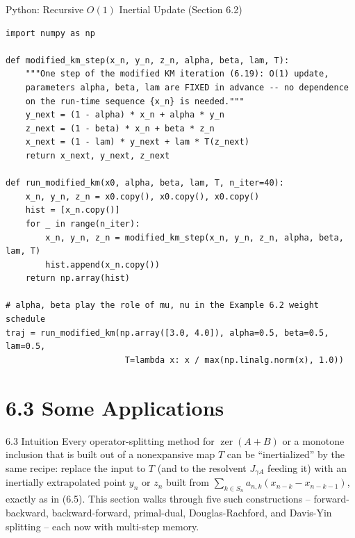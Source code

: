 \documentclass[aspectratio=169,10pt]{beamer}
\newcommand{\zer}{\operatorname{zer}}
\begin{document}
\begin{frame}[fragile]{Python: Recursive $O(1)$ Inertial Update (Section 6.2)}
\begin{lstlisting}
import numpy as np

def modified_km_step(x_n, y_n, z_n, alpha, beta, lam, T):
    """One step of the modified KM iteration (6.19): O(1) update,
    parameters alpha, beta, lam are FIXED in advance -- no dependence
    on the run-time sequence {x_n} is needed."""
    y_next = (1 - alpha) * x_n + alpha * y_n
    z_next = (1 - beta) * x_n + beta * z_n
    x_next = (1 - lam) * y_next + lam * T(z_next)
    return x_next, y_next, z_next

def run_modified_km(x0, alpha, beta, lam, T, n_iter=40):
    x_n, y_n, z_n = x0.copy(), x0.copy(), x0.copy()
    hist = [x_n.copy()]
    for _ in range(n_iter):
        x_n, y_n, z_n = modified_km_step(x_n, y_n, z_n, alpha, beta, lam, T)
        hist.append(x_n.copy())
    return np.array(hist)

# alpha, beta play the role of mu, nu in the Example 6.2 weight schedule
traj = run_modified_km(np.array([3.0, 4.0]), alpha=0.5, beta=0.5, lam=0.5,
                        T=lambda x: x / max(np.linalg.norm(x), 1.0))
\end{lstlisting}
\end{frame}

\section{6.3 Some Applications}

\begin{frame}{6.3 Intuition}
Every operator-splitting method for $\zer(A+B)$ or a monotone inclusion
that is built out of a nonexpansive map $T$ can be ``inertialized'' by the
same recipe: replace the input to $T$ (and to the resolvent $J_{\gamma A}$
feeding it) with an inertially extrapolated point $y_n$ or $z_n$ built from
$\sum_{k\in S_n}a_{n,k}(x_{n-k}-x_{n-k-1})$, exactly as in (6.5). This
section walks through five such constructions -- forward-backward,
backward-forward, primal-dual, Douglas-Rachford, and Davis-Yin splitting
-- each now with multi-step memory.
\end{frame}
\end{document}
